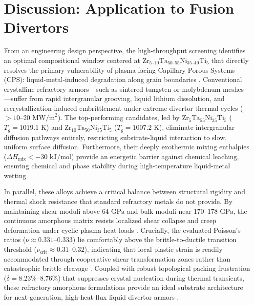\documentclass[aps,prmaterials,reprint,superscriptaddress,amsmath,amssymb,floatfix]{revtex4-2}
\begin{document}
\section{Discussion: Application to Fusion Divertors}

From an engineering design perspective, the high-throughput screening identifies an optimal compositional window centered at $\text{Zr}_{5\text{--}10}\text{Ta}_{50\text{--}55}\text{Ni}_{35\text{--}40}\text{Ti}_5$ that directly resolves the primary vulnerability of plasma-facing Capillary Porous Systems (CPS): liquid-metal-induced degradation along grain boundaries \cite{CPS_Review_2020}. Conventional crystalline refractory armors---such as sintered tungsten or molybdenum meshes---suffer from rapid intergranular grooving, liquid lithium dissolution, and recrystallization-induced embrittlement under extreme divertor thermal cycles ($>10\text{--}20\text{ MW/m}^2$). The top-performing candidates, led by $\text{Zr}_5\text{Ta}_{55}\text{Ni}_{35}\text{Ti}_5$ ($T_g = 1019.1\text{ K}$) and $\text{Zr}_{10}\text{Ta}_{50}\text{Ni}_{35}\text{Ti}_5$ ($T_g = 1007.2\text{ K}$), eliminate intergranular diffusion pathways entirely, restricting substrate-liquid interaction to slow, uniform surface diffusion. Furthermore, their deeply exothermic mixing enthalpies ($\Delta H_{\text{mix}} < -30\text{ kJ/mol}$) provide an energetic barrier against chemical leaching, ensuring chemical and phase stability during high-temperature liquid-metal wetting.

In parallel, these alloys achieve a critical balance between structural rigidity and thermal shock resistance that standard refractory metals do not provide. By maintaining shear moduli above $64\text{ GPa}$ and bulk moduli near $170\text{--}178\text{ GPa}$, the continuous amorphous matrix resists localized shear collapse and creep deformation under cyclic plasma heat loads \cite{Argon1979,Spaepen1977,Linke2010}. Crucially, the evaluated Poisson's ratios ($\nu \approx 0.331\text{--}0.333$) lie comfortably above the brittle-to-ductile transition threshold ($\nu_{\text{crit}} \approx 0.31\text{--}0.32$), indicating that local plastic strain is readily accommodated through cooperative shear transformation zones rather than catastrophic brittle cleavage \cite{Wang2004BMG,Morgan2016}. Coupled with robust topological packing frustration ($\delta = 8.23\%\text{--}8.76\%$) that suppresses crystal nucleation during thermal transients, these refractory amorphous formulations provide an ideal substrate architecture for next-generation, high-heat-flux liquid divertor armors \cite{CPS_Review_2020}.
\end{document}
